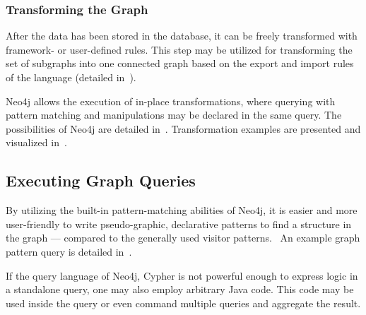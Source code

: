 \subsubsection{Transforming the Graph}
After the data has been stored in the database, it can be freely transformed with framework- or user-defined rules. This step may be utilized for transforming the set of subgraphs into one connected graph based on the export and import rules of the language (detailed in~).

Neo4j allows the execution of in-place transformations, where querying with pattern matching and manipulations may be declared in the same query. The possibilities of Neo4j are detailed in~. Transformation examples are presented and visualized in~.

\subsection{Executing Graph Queries}
By utilizing the built-in pattern-matching abilities of Neo4j, it is easier and more user-friendly to write pseudo-graphic, declarative patterns to find a structure in the graph --- compared to the generally used visitor patterns.~\cite{csmr} An example graph pattern query is detailed in~.

If the query language of Neo4j, Cypher is not powerful enough to express logic in a standalone query, one may also employ arbitrary Java code. This code may be used inside the query or even command multiple queries and aggregate the result.
